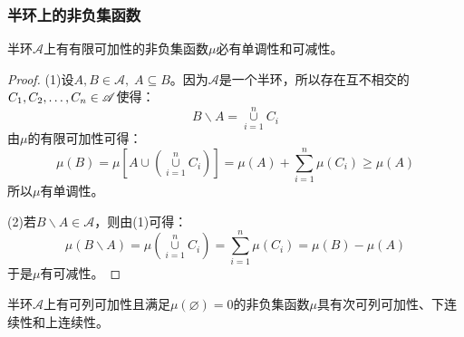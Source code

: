 \subsubsection{半环上的非负集函数}
\begin{theorem}\label{theo:SemiringFiniteAdditivitySetfunction}
	半环$\mathscr{A}$上有有限可加性的非负集函数$\mu$必有单调性和可减性。
\end{theorem}
\begin{proof}
	(1)设$A,B\in\mathscr{A},\;A\subseteq B$。因为$\mathscr{A}$是一个半环，所以存在互不相交的$C_1, C_2, \dots, C_{n}\in \mathscr{A}$使得：
	\begin{equation*}
		B\backslash A=\underset{i=1}{\overset{n}{\cup}}C_i
	\end{equation*}
	由$\mu$的有限可加性可得：
	\begin{equation*}
		\mu(B)=\mu\left[A\cup\left(\underset{i=1}{\overset{n}{\cup}}C_i\right)\right]=\mu(A)+\sum_{i=1}^{n}\mu(C_i)\geqslant\mu(A)
	\end{equation*}
	所以$\mu$有单调性。\par
	(2)若$B\backslash A\in\mathscr{A}$，则由(1)可得：
	\begin{equation*}
		\mu(B\backslash A)=\mu\left(\underset{i=1}{\overset{n}{\cup}}C_i\right)=\sum_{i=1}^{n}\mu(C_i)=\mu(B)-\mu(A)
	\end{equation*}
	于是$\mu$有可减性。
\end{proof}
\begin{theorem}\label{theo:SemiringCountableAdditivitySetFunction}
	半环$\mathscr{A}$上有可列可加性且满足$\mu(\varnothing)=0$的非负集函数$\mu$具有次可列可加性、下连续性和上连续性。
\end{theorem}
